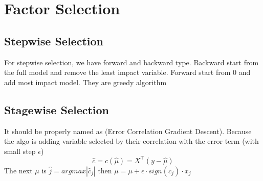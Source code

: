 \section{Factor Selection}
\subsection{Stepwise Selection}
For stepwise selection, we have forward and backward type. Backward start from the full model and remove the least impact variable. Forward start from 0 and add most impact model. They are greedy algorithm

\subsection{Stagewise Selection}
It should be properly named as {\color{blue}(Error Correlation Gradient Descent)}. Because the algo is adding variable selected by their correlation with the error term (with small step $\epsilon$)
\begin{equation}
  \hat{c} = c(\hat{\mu}) = X^\top (y-\hat{\mu})
\end{equation}
The next $\mu$ is  $\hat{j} = argmax |\hat{c}_j|$ then $\mu = \mu + \epsilon \cdot sign(\hat{c}_j) \cdot x_j$
